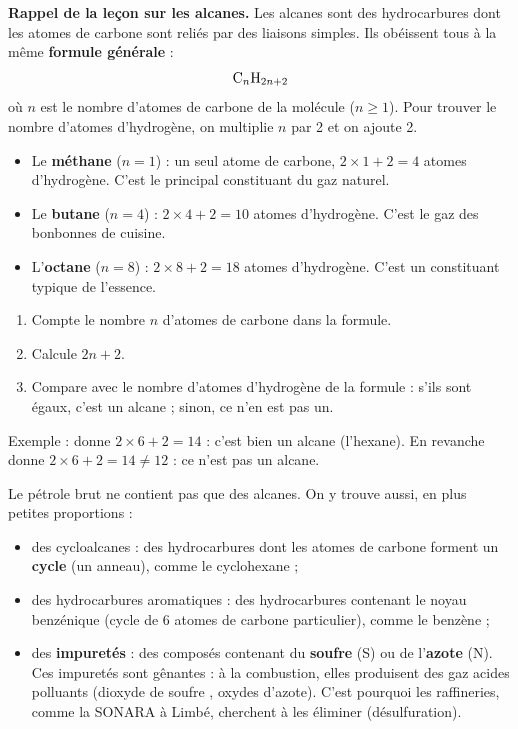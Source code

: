 \documentclass[11pt]{article}
\newcommand{\cle}[1]{{\popxbold\color{popdark}#1}}
\newcounter{popsec}
\newcounter{popsub}
\newcommand{\courssub}[1]{%
  \stepcounter{popsub}%
  \par\vspace{9pt}\noindent{\popxbold\fontsize{11.5}{13}\selectfont\color{popink}{\color{poporange}\thepopsec.\thepopsub}\hspace{6pt}#1}\par\nopagebreak\vspace{4pt}
}
\begin{document}
\textbf{Rappel de la leçon sur les alcanes.} Les \cle{alcanes} sont des hydrocarbures dont les atomes de carbone sont reliés par des liaisons simples. Ils obéissent tous à la même \textbf{formule générale} :
\[ \ce{C_{n}H_{2n+2}} \]
où $n$ est le nombre d'atomes de carbone de la molécule ($n \geq 1$). Pour trouver le nombre d'atomes d'hydrogène, on multiplie $n$ par 2 et on ajoute 2.

\begin{exemplebox}
\begin{itemize}
\item Le \textbf{méthane}  ($n = 1$) : un seul atome de carbone, $2 \times 1 + 2 = 4$ atomes d'hydrogène. C'est le principal constituant du gaz naturel.
\item Le \textbf{butane}  ($n = 4$) : $2 \times 4 + 2 = 10$ atomes d'hydrogène. C'est le gaz des bonbonnes de cuisine.
\item L'\textbf{octane}  ($n = 8$) : $2 \times 8 + 2 = 18$ atomes d'hydrogène. C'est un constituant typique de l'essence.
\end{itemize}
\end{exemplebox}

\begin{methode}
\begin{enumerate}
\item Compte le nombre $n$ d'atomes de carbone dans la formule.
\item Calcule $2n + 2$.
\item Compare avec le nombre d'atomes d'hydrogène de la formule : s'ils sont égaux, c'est un alcane ; sinon, ce n'en est pas un.
\end{enumerate}
Exemple :  donne $2 \times 6 + 2 = 14$ : c'est bien un alcane (l'hexane). En revanche  donne $2 \times 6 + 2 = 14 \neq 12$ : ce n'est pas un alcane.
\end{methode}

\courssub{Les autres constituants du pétrole}

Le pétrole brut ne contient pas que des alcanes. On y trouve aussi, en plus petites proportions :

\begin{itemize}
\item des \cle{cycloalcanes} : des hydrocarbures dont les atomes de carbone forment un \textbf{cycle} (un anneau), comme le cyclohexane  ;
\item des \cle{hydrocarbures aromatiques} : des hydrocarbures contenant le noyau benzénique (cycle de 6 atomes de carbone particulier), comme le benzène  ;
\item des \textbf{impuretés} : des composés contenant du \textbf{soufre} (S) ou de l'\textbf{azote} (N). Ces impuretés sont gênantes : à la combustion, elles produisent des gaz acides polluants (dioxyde de soufre , oxydes d'azote). C'est pourquoi les raffineries, comme la SONARA à Limbé, cherchent à les éliminer (désulfuration).
\end{itemize}
\end{document}
